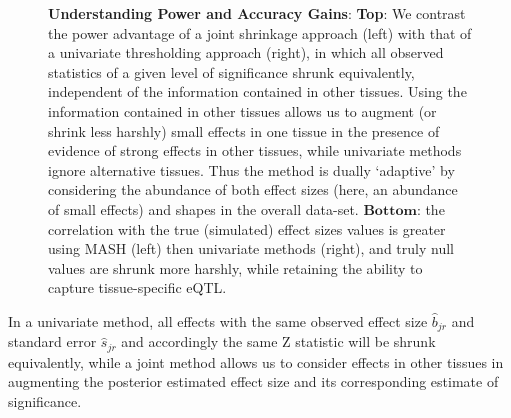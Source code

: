 \begin{figure}[htbp]
\caption{\textbf{Understanding Power and Accuracy Gains}: \textbf{Top}: We contrast the power advantage of a joint shrinkage approach (left) with that of a univariate thresholding approach (right), in which all observed statistics of a given level of significance shrunk equivalently, independent of the information contained in other tissues. Using the information contained in other tissues allows us to augment (or shrink less harshly) small effects in one tissue in the presence of evidence of strong effects in other tissues, while univariate methods ignore alternative tissues. Thus the method is dually `adaptive' by considering the abundance of both effect sizes (here, an abundance of small effects) and shapes in the overall data-set. $\textbf{Bottom}$: the correlation with the true (simulated) effect sizes values is greater using MASH (left) then univariate methods (right), and truly null values are shrunk more harshly, while retaining the ability to capture tissue-specific eQTL.}
 \label{fig:simulationscatter}
\end{figure}\newline
%
In a univariate method, all effects with the same observed effect size $\hat{b}_{jr}$ and standard error $\hat{s}_{jr}$ and accordingly the same Z statistic will be shrunk equivalently, while a joint method allows us to consider effects in other tissues in augmenting the posterior estimated effect size and its corresponding estimate of significance.
